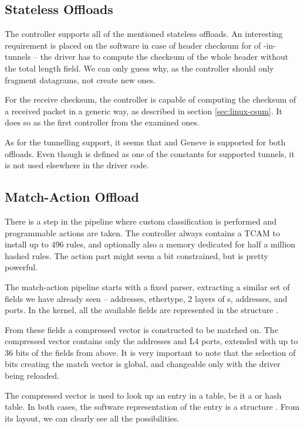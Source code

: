 \subsection{Stateless Offloads}

The controller supports all of the mentioned stateless offloads. An interesting
requirement is placed on the software in case of  header checksum for
 of -in- tunnels -- the driver has to compute the checksum
of the whole  header without the total length field. We can only guess
why, as the controller should only fragment  datagrams, not create new
ones.

For the receive checksum, the controller is capable of computing the checksum
of a received packet in a generic way, as described in section
\ref{sec:linux-csum}. It does so as the first controller from the examined
ones.

As for the tunnelling support, it seems that  and Geneve is supported
for both offloads. Even though  is defined as one of the constants for
supported tunnels, it is not used elsewhere in the driver code.

\subsection{Match-Action Offload}

There is a step in the pipeline where custom classification is performed and
programmable actions are taken. The controller always contains a TCAM to
install up to 496 rules, and optionally also a memory dedicated for half
a million hashed rules. The action part might seem a bit constrained, but is
pretty powerful.

The match-action pipeline starts with a fixed parser, extracting a similar set
of fields we have already seen --  addresses, ethertype, 2 layers of
s,  addresses,  and  ports. In the kernel, all the
available fields are represented in the structure
.

From these fields a compressed vector is constructed to be matched on. The
compressed vector contains only the  addresses and L4 ports, extended with up
to 36 bits of the fields from above. It is very important to note that the
selection of bits creating the match vector is global, and changeable only with
the driver being reloaded.

The compressed vector is used to look up an entry in a table, be it a  or
hash table. In both cases, the software representation of the entry is a structure
.
From its layout, we can clearly see all the possibilities.

